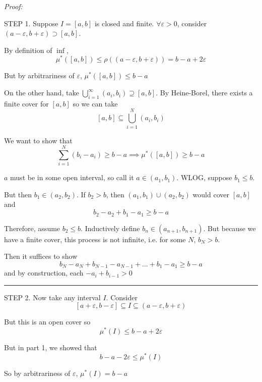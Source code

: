 \documentclass[12pt]{report}
\newcommand{\R}{\mathbb{R}}
\newcommand{\ep}{\varepsilon}
\newcommand{\sub}{\subseteq}
\renewcommand{\div}{\vspace*{10pt}\hrule\vspace*{10pt}}
\newenvironment*{tbox}[2][gray]{
    \begin{tcolorbox}[
        parbox=false,
        colback=#1!5!white,
        colframe=#1!75!black,
        breakable,
        title={#2}
    ]}
    {\end{tcolorbox}}
\begin{document}
    \begin{tbox}{\textbf{Proposition (Faithfulness of the Lebesgue Measure):} Let $I$ be any interval (closed, open, half-open, etc.) on $\R$. Then $\mu(I) = \rho(I)$}
        \emph{Proof:} 
        
        STEP 1. Suppose $I = [a, b]$ is closed and finite. $\forall \ep > 0$, consider $(a - \ep, b + \ep) \supset [a, b]$.

        By definition of $\inf$, 
        \[\mu^*([a, b]) \leq \rho((a - \ep, b + \ep)) = b - a + 2\ep\]

        But by arbitrariness of $\ep$, $\mu^*([a, b]) \leq b - a$

        On the other hand, take $\bigcup_{i=1}^\infty (a_i, b_i) \supseteq [a, b]$. By Heine-Borel, there exists a finite cover for $[a, b]$ so we can take 
        \[[a, b] \sub \bigcup_{i=1}^N (a_i, b_i)\]

        We want to show that 
        \[\sum_{i=1}^{N} (b_i - a_i) \geq b - a \implies \mu^*([a, b]) \geq b - a\]

        $a$ must be in some open interval, so call it $a \in (a_1, b_1)$. WLOG, suppose $b_1 \leq b$. 
    
        But then $b_1 \in (a_2, b_2)$. If $b_2 > b$, then $(a_1, b_1) \cup (a_2, b_2)$ would cover $[a, b]$ and 
        \[b_2 - a_2 + b_1 - a_1 \geq b - a\]

        Therefore, assume $b_2 \leq b$. Inductively define $b_n \in (a_{n+1}, b_{n+1})$. But because we have a finite cover, this process is not infinite, i.e. for some $N$, $b_N > b$. 

        Then it suffices to show 
        \[b_N - a_N + b_{N-1} - a_{N-1} + \dots + b_1 - a_1 \geq b - a\]
        and by construction, each $-a_{i} + b_{i-1} > 0$

        \div

        STEP 2. Now take any interval $I$. Consider
        \[[a + \ep, b - \ep] \sub I \sub (a - \ep, b + \ep)\] 

        But this is an open cover so 
        \[\mu^*(I) \leq b - a + 2\ep\] 

        But in part 1, we showed that 
        \[b - a - 2\ep \leq \mu^*(I)\]

        So by arbitrariness of $\ep$, $\mu^*(I) = b - a$
    \end{tbox}
\end{document}
